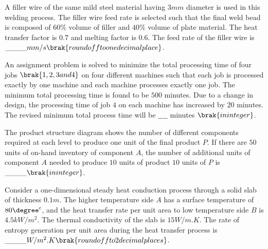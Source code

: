      A filler wire of the same mild steel material having $3 mm$ diameter is used in this welding process. The filler wire feed rate is selected such that the final weld bead is composed of $60\%$ volume of filler and $40\%$ volume of plate material. The heat transfer factor is $0.7$ and melting factor is $0.6$. The feed rate of the filler wire is $\_\_\_\_ mm/s \brak{round off to one decimal place}$.\\
     \item An assignment problem is solved to minimize the total processing time of four jobs $\brak{1,2,3 and 4}$ on four different machines such that each job is processed exactly by one machine and each machine processes exactly one job. The minimum total processing time is found to be $500$ minutes. Due to a change in design, the processing time of job $4$ on each machine has increased by $20$ minutes. The revised minimum total process time will be $\_\_\_\_$ minutes $\brak{in integer}$.\\
     \item The product structure diagram shows the number of different components required 
     at each level to produce one unit of the final product $P$. If there are $50$ units of on-hand inventory of component $A$, the number of additional units of component $A$ needed to produce $10$ units of product $10$ units of $P$ is $\_\_\_\_ \brak{in integer}$.\\
     \item Consider a one-dimensional steady heat conduction process through a solid slab of 
     thickness $0.1 m$. The higher temperature side $A$ has a surface temperature of $80\degree^{c}$, and the heat transfer rate per unit area to low temperature side $B$ is$ 4.5 kW/m^{2}$. The thermal conductivity of the slab is $15 W/m.K$. The rate of entropy generation per unit area during the heat transfer process is $\_\_\_\_ W/m^{2}.K \brak{round off to 2 decimal places}$.\\
